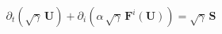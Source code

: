 \documentclass[10pt]{article}
\begin{document}
\begin{align*}\partial_{t}\left(\sqrt{\gamma}\,\boldsymbol{U}\right)+\partial_{i}\left(\alpha\,\sqrt{\gamma}\,\boldsymbol{F}^{i}\left(\boldsymbol{U}\right)\right)=\sqrt{\gamma}\,\boldsymbol{S}\end{align*}
\end{document}
